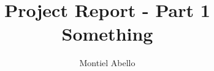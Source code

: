 \documentclass[a4paper, twoside, 11pt]{book}
\begin{document}
\title{Project Report - Part 1\\ Something}
\author{Montiel Abello}
\date{}  %
\maketitle












\end{document}
